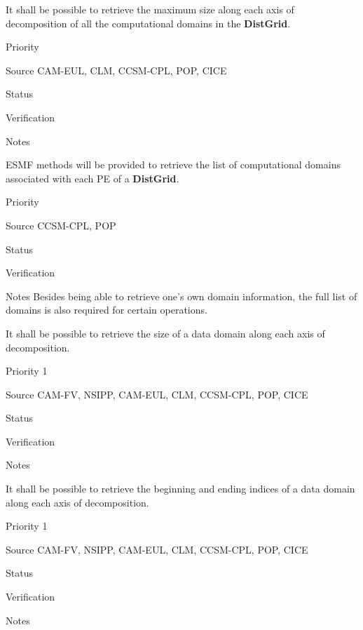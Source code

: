 
It shall be possible to retrieve the maximum size along each axis of
decomposition of all the computational domains in the \textbf{DistGrid}. 

\begin{reqlist}
\item[Priority] 
\item[Source] CAM-EUL, CLM, CCSM-CPL, POP, CICE
\item[Status]
\item[Verification]
\item[Notes]
\end{reqlist}


ESMF methods will be provided to retrieve the list of computational
domains associated with each PE of a  \textbf{DistGrid}.

\begin{reqlist}
\item[Priority] 
\item[Source] CCSM-CPL, POP
\item[Status]
\item[Verification]
\item[Notes] Besides being able to retrieve one's own domain
  information, the full list of domains is also required for certain
  operations.
\end{reqlist}



It shall be possible to retrieve the size of a data domain
along each axis of decomposition.

\begin{reqlist}
\item[Priority] 1
\item[Source] CAM-FV, NSIPP, CAM-EUL, CLM, CCSM-CPL, POP, CICE
\item[Status]
\item[Verification]
\item[Notes]
\end{reqlist}


It shall be possible to retrieve the beginning and ending indices of a
data domain along each axis of decomposition.

\begin{reqlist}
\item[Priority] 1
\item[Source] CAM-FV, NSIPP, CAM-EUL, CLM, CCSM-CPL, POP, CICE
\item[Status]
\item[Verification]
\item[Notes]
\end{reqlist}

